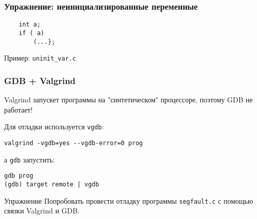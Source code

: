 \begin{frame}[fragile]
	\frametitle{Упражнение: неинициализированные переменные}

	\begin{lstlisting}
    int a;
    if ( a)
        (...};
	\end{lstlisting}

	Пример: {\tt uninit\_var.c}
\end{frame}

\begin{frame}[fragile]
	\frametitle{GDB + Valgrind}

	Valgrind запускет программы на "синтетическом" процессоре, поэтому GDB не работает!

	Для отладки используется {\tt vgdb}: \\

	\begin{verbatim}
valgrind -vgdb=yes --vgdb-error=0 prog
	\end{verbatim}


	а {\tt gdb} запустить:
	\begin{verbatim}
gdb prog
(gdb) target remote | vgdb
	\end{verbatim}

	\pause
	\begin{block}{Упражнение}
		Попробовать провести отладку программы {\tt segfault.c} с помощью связки Valgrind и GDB.
	\end{block}
\end{frame}



